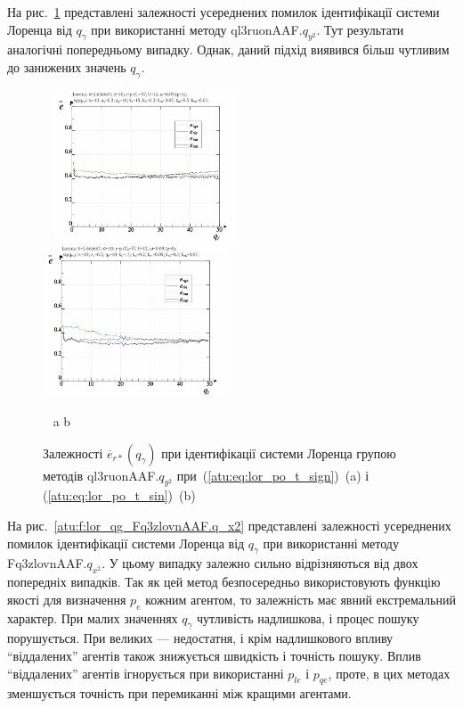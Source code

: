 На рис.~\ref{atu:f:lor_qg_ql3ruonAAF.q_y2} представлені залежності усереднених
помилок ідентифікації системи Лоренца від
$ q_\gamma $ при використанні методу
ql3ruonAAF.$q_{y^2}$.
Тут результати аналогічні попередньому випадку. Однак, даний
підхід виявився більш чутливим до занижених значень $ q_\gamma $.

\begin{figure}[ht!]
  \begin{center}
    ~ \hfill
    \includegraphics[width=0.49\textwidth]{p/cha/lor/ql3ruonAAF/lor_ql3ruonAAF_qy2-p_qgamma_e_sign.png}
    \hfill
    \includegraphics[width=0.49\textwidth]{p/cha/lor/ql3ruonAAF/lor_ql3ruonAAF_qy2-p_qgamma_e_sin.png}
    \hfill ~
  \end{center}
  \vspace{-1.0ex}
  \begin{center}
    ~ \hfill a \hfill\hfill b \hfill ~
  \end{center}
  \vspace{-1.5ex}
  \caption{Залежності $ \overline{e}_{r *} (q_\gamma) $ при ідентифікації системи Лоренца групою методів ql3ruonAAF.$q_{y^2} $ при~(\ref{atu:eq:lor_po_t_sign})~(a) і (\ref{atu:eq:lor_po_t_sin})~(b)}
  \label{atu:f:lor_qg_ql3ruonAAF.q_y2}
\end{figure}


На рис.~\ref{atu:f:lor_qg_Fq3zlovnAAF.q_x2} представлені залежності усереднених
помилок ідентифікації системи Лоренца від
$ q_\gamma $ при використанні методу
Fq3zlovnAAF.$q_{x^2}$.
У цьому випадку залежно сильно відрізняються від двох
попередніх випадків. Так як цей метод безпосередньо
використовують функцію якості для визначення
$ p_e $ кожним агентом, то залежність має явний екстремальний
характер. При малих значеннях
$ q_\gamma $ чутливість надлишкова, і процес пошуку порушується. При
великих --- недостатня, і крім надлишкового впливу ``віддалених''
агентів також знижується швидкість і точність пошуку. Вплив
``віддалених'' агентів ігнорується при використанні
$ p_{le} $ і
$ p_{qe} $, проте, в цих методах зменшується точність при перемиканні
між кращими агентами.


